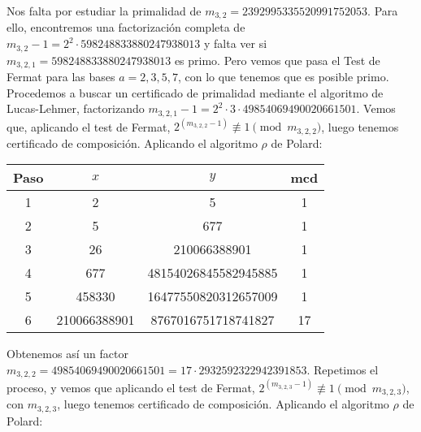 \documentclass[fleqn]{article}
\begin{document}
    Nos falta por estudiar la primalidad de 
    $m_{3,2} = 2392995335520991752053$. Para ello, encontremos una factorización completa de $m_{3,2} -1 = 2^2 \cdot 598248833880247938013$ y falta ver si
    $m_{3,2,1} = 598248833880247938013$ es primo. Pero vemos que pasa el Test de Fermat para las bases $a = 2,3,5,7$,
    con lo que tenemos que es posible primo. Procedemos a buscar un certificado de primalidad mediante el algoritmo de Lucas-Lehmer, factorizando 
    $m_{3,2,1} -1 = 2^2 \cdot 3 \cdot 49854069490020661501$. Vemos que, aplicando el test de Fermat, $2^{(m_{3,2,2} - 1)} \not\equiv 1 \pmod{m_{3,2,2}}$, luego tenemos 
    certificado de composición. Aplicando el algoritmo $\rho$ de Polard:
    \begin{center}
        \begin{tabular}{| c | c | c | c |}
            \hline Paso & $x$ & $y$ & mcd \\ \hline
            1 & 2 & 5 & 1 \\
            2 & 5 & 677 & 1 \\
            3 & 26 & 210066388901 & 1 \\
            4 & 677 & 48154026845582945885 & 1 \\
            5 & 458330 & 16477550820312657009 & 1 \\
            6 & 210066388901 & 8767016751718741827 & 17 \\ \hline
        \end{tabular}
    \end{center}
    Obtenemos así un factor $m_{3,2,2} = 49854069490020661501 = 17 \cdot 2932592322942391853$. Repetimos el proceso, y vemos que aplicando el test de
    Fermat, $2^{(m_{3,2,3} - 1)} \not\equiv 1 \pmod{m_{3,2,3}}$, con $m_{3,2,3}$, luego tenemos certificado de composición. Aplicando el algoritmo $\rho$ de Polard:
\end{document}
